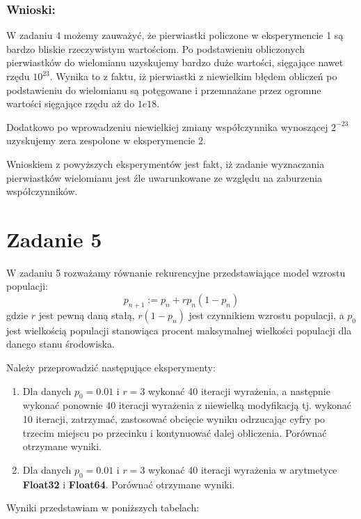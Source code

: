 \documentclass[12pt]{article}
\begin{document}
\subsubsection*{Wnioski:}
W zadaniu 4 możemy zauważyć, że pierwiastki policzone w eksperymencie 1 są bardzo bliskie rzeczywistym wartościom. Po podstawieniu obliczonych pierwiastków do wielomianu uzyskujemy bardzo duże wartości, sięgające nawet rzędu $10^{23}$. Wynika to z faktu, iż pierwiastki z niewielkim błędem obliczeń po podstawieniu do wielomianu są potęgowane i przemnażane przez ogromne wartości sięgające rzędu aż do $1e18$. 

Dodatkowo po wprowadzeniu niewielkiej zmiany współczynnika wynoszącej $2^{-23}$ uzyskujemy zera zespolone w eksperymencie 2.

Wnioskiem z powyższych eksperymentów jest fakt, iż zadanie wyznaczania pierwiastków wielomianu jest źle uwarunkowane ze względu na zaburzenia współczynników.


\section{Zadanie 5}
W zadaniu 5 rozważamy równanie rekurencyjne przedstawiające model wzrostu populacji:
\begin{equation*}
	p_{n+1} := p_n+rp_n(1-p_n)
\end{equation*}
gdzie $r$ jest pewną daną stałą, $r(1-p_n)$ jest czynnikiem wzrostu populacji, a $p_0$ jest wielkością populacji stanowiąca procent maksymalnej wielkości populacji dla danego stanu środowiska.

Należy przeprowadzić następujące eksperymenty:
\begin{enumerate}
	\item{Dla danych $p_0 = 0.01$ i $r = 3$ wykonać 40 iteracji wyrażenia, a następnie wykonać ponownie 40 iteracji wyrażenia z niewielką modyfikacją tj. wykonać 10 iteracji, zatrzymać, zastosować obcięcie wyniku odrzucając cyfry po trzecim miejscu po przecinku i kontynuować dalej obliczenia. Porównać otrzymane wyniki.}
	\item{Dla danych $p_0 = 0.01$ i $r = 3$ wykonać 40 iteracji wyrażenia w arytmetyce \textbf{Float32} i \textbf{Float64}. Porównać otrzymane wyniki.}
\end{enumerate}

Wyniki przedstawiam w poniższych tabelach:
\end{document}
